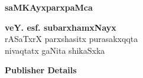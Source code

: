 \thispagestyle{empty}
\begin{center}
{\Huge\bfseries saMKAyxparxpaMca}
\vfill


{\LARGE\bfseries veY. esf. subarxhamxNayx}\\[4pt]
{\large rASaTxrX parxshasitx purasakxqqta\\[4pt]
nivaqtatx gaNita shikaSxka}
\vfill

{\Large\rm\bfseries Publisher Details}





\end{center}
